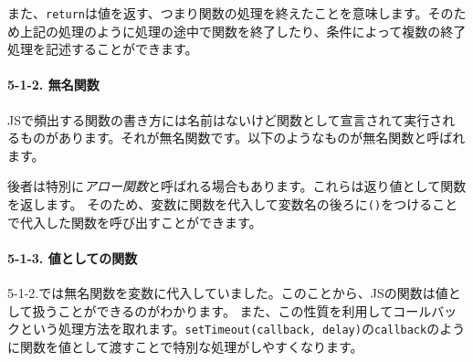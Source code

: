 また、\texttt{return}は値を返す、つまり関数の処理を終えたことを意味します。そのため上記の処理のように処理の途中で関数を終了したり、条件によって複数の終了処理を記述することができます。

\paragraph{5-1-2. 無名関数}\label{ux7121ux540dux95a2ux6570}

JSで頻出する関数の書き方には名前はないけど関数として宣言されて実行されるものがあります。それが無名関数です。以下のようなものが無名関数と呼ばれます。

\begin{Shaded}
\begin{Highlighting}[]
  \OperatorTok{;}
\NormalTok{\}}\OperatorTok{;}

\KeywordTok{=\textgreater{}}\NormalTok{ \{}
  \OperatorTok{;}
\NormalTok{\}}\OperatorTok{;}
\end{Highlighting}
\end{Shaded}

後者は特別に\emph{アロー関数}と呼ばれる場合もあります。これらは返り値として関数を返します。
そのため、変数に関数を代入して変数名の後ろに\texttt{()}をつけることで代入した関数を呼び出すことができます。

\begin{Shaded}
\begin{Highlighting}[]
\OperatorTok{=} 
  \OperatorTok{;}
\NormalTok{\}}\OperatorTok{;}
\NormalTok{(}\NormalTok{)}\OperatorTok{;}
\end{Highlighting}
\end{Shaded}

\paragraph{5-1-3.
値としての関数}\label{ux5024ux3068ux3057ux3066ux306eux95a2ux6570}

5-1-2.では無名関数を変数に代入していました。このことから、JSの関数は値として扱うことができるのがわかります。
また、この性質を利用してコールバックという処理方法を取れます。\texttt{setTimeout(callback,\ delay)}の\texttt{callback}のように関数を値として渡すことで特別な処理がしやすくなります。

